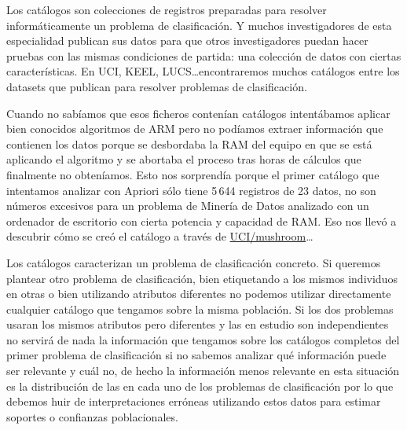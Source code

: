 Los catálogos son colecciones de registros preparadas para resolver informáticamente un problema de clasificación. Y muchos investigadores de esta especialidad publican sus datos para que otros investigadores puedan hacer pruebas con las mismas condiciones de partida: una colección de datos con ciertas características. En UCI, KEEL, LUCS\ldots encontraremos muchos catálogos entre los datasets que publican para resolver problemas de clasificación.

Cuando no sabíamos que esos ficheros contenían catálogos intentábamos aplicar bien conocidos algoritmos de ARM pero no podíamos extraer información que contienen los datos porque se desbordaba la RAM del equipo en que se está aplicando el algoritmo y se abortaba el proceso tras horas de cálculos que finalmente no obteníamos. Esto nos sorprendía porque el primer catálogo que intentamos analizar con Apriori sólo tiene 5\,644 registros de 23 datos, no son números excesivos para un problema de Minería de Datos analizado con un ordenador de escritorio con cierta potencia y capacidad de RAM. Eso nos llevó a descubrir cómo se creó el catálogo a través de \url{UCI/mushroom}\ldots

Los catálogos caracterizan un problema de clasificación concreto. Si queremos plantear otro problema de clasificación, bien etiquetando a los mismos individuos en otras \clases o bien utilizando atributos diferentes no podemos utilizar directamente cualquier catálogo que tengamos sobre la misma población. Si los dos problemas usaran los mismos atributos pero diferentes \clases y las \clases en estudio son independientes no servirá de nada la información que tengamos sobre los catálogos completos del primer problema de clasificación si no sabemos analizar qué información puede ser relevante y cuál no, de hecho la información menos relevante en esta situación es la distribución de las \clases en cada uno de los problemas de clasificación por lo que debemos huir de interpretaciones erróneas utilizando estos datos para estimar soportes o confianzas poblacionales.

